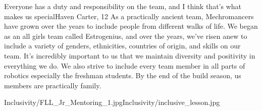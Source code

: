 {Everyone has a duty and responsibility on the team, and I think that's what makes us special}{Haven Carter, 12}
{As a practically ancient team, Mechromancers have grown over the years to include people from different walks of life. We began as an all girls team called Estrogenius, and over the years, we’ve risen anew to include a variety of genders, ethnicities, countries of origin, and skills on our team. It’s incredibly important to us that we maintain diversity and positivity in everything we do. We also strive to include every team member in all parts of robotics especially the freshman students. By the end of the build season, us members are practically family.}
{
\item[$\blacksquare$] \pageref{Inclusivity:1}
\item[$\blacksquare$] \pageref{FLLJR:1}
\item[$\blacksquare$] \pageref{Inclusivity:3}
}
{Inclusivity/FLL_Jr_Mentoring_1.jpg}{Inclusivity/inclusive_lesson.jpg}
